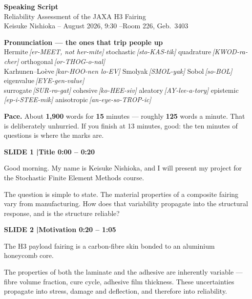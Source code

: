 \documentclass[12pt,a4paper]{article}
\newcommand{\slide}[3]{%
  \bigskip
  \noindent\colorbox{luhblue}{\parbox{\dimexpr\linewidth-2\fboxsep}{%
    \color{white}\bfseries\small SLIDE #1 \quad|\quad #2 \hfill #3}}\par
  \nopagebreak\vspace{0.3em}}
\newcommand{\num}[1]{\textbf{#1}}
\newcommand{\pron}[2]{#1\,{\scriptsize\itshape[#2]}}
\begin{document}
\begin{center}
{\LARGE\bfseries Speaking Script}\\[0.3em]
{\large Reliability Assessment of the JAXA H3 Fairing}\\[0.2em]
{\normalsize Keisuke Nishioka \quad-- August 2026, 9:30 \quad--\quad Room 226, Geb.\ 3403}
\end{center}

\vspace{0.5em}
\begin{tcolorbox}[colback=soft,colframe=luhblue,boxrule=0.6pt,arc=2pt]
{\bfseries Pronunciation --- the ones that trip people up}\\[0.3em]
\pron{Hermite}{er-MEET, not her-mite} \quad
\pron{stochastic}{sto-KAS-tik} \quad
\pron{quadrature}{KWOD-ra-cher} \quad
\pron{orthogonal}{or-THOG-o-nal}\\
\pron{Karhunen--Lo\`{e}ve}{kar-HOO-nen lo-EV} \quad
\pron{Smolyak}{SMOL-yak} \quad
\pron{Sobol}{so-BOL} \quad
\pron{eigenvalue}{EYE-gen-value}\\
\pron{surrogate}{SUR-ro-gat} \quad
\pron{cohesive}{ko-HEE-siv} \quad
\pron{aleatory}{AY-lee-a-tory} \quad
\pron{epistemic}{ep-i-STEE-mik} \quad
\pron{anisotropic}{an-eye-so-TROP-ic}

\smallskip
{\bfseries Pace.} About \num{1{,}900} words for \num{15} minutes --- roughly \num{125}
words a minute. That is deliberately unhurried. If you finish at 13 minutes, good:
the ten minutes of questions is where the marks are.
\end{tcolorbox}

\slide{1}{Title}{0:00 -- 0:20}

Good morning. My name is Keisuke Nishioka, and I will present my project for the
Stochastic Finite Element Methods course.

The question is simple to state. The material properties of a composite fairing vary
from manufacturing. How does that variability propagate into the structural response,
and is the structure reliable?

\slide{2}{Motivation}{0:20 -- 1:05}
The H3 payload fairing is a carbon-fibre skin bonded to an aluminium honeycomb core.

The properties of both the laminate and the adhesive are inherently variable ---
fibre volume fraction, cure cycle, adhesive film thickness. These uncertainties
propagate into stress, damage and deflection, and therefore into reliability.
\end{document}
